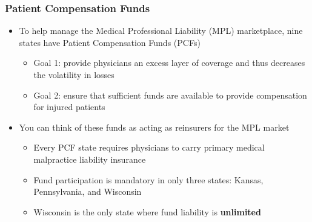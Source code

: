 \documentclass[serif,10pt]{beamer}
\begin{document}
\begin{frame}
\frametitle{Patient Compensation Funds}
  \begin{itemize}
\item To help manage the Medical Professional Liability (MPL) marketplace, nine states have Patient Compensation Funds (PCFs)
  \begin{itemize}
\item Goal 1: provide physicians an excess layer of coverage and thus decreases the volatility in losses
\item Goal 2: ensure that sufficient funds are available to provide compensation for injured patients
\end{itemize}
\item You can think of these funds as acting as reinsurers for the MPL market
  \begin{itemize}
\item Every PCF state requires physicians to carry primary medical malpractice liability insurance
\item Fund participation is mandatory in only three states: Kansas, Pennsylvania, and Wisconsin
\item Wisconsin is the only state where fund liability is \textbf{unlimited}
\end{itemize}
\end{itemize}
\end{frame}
\end{document}
